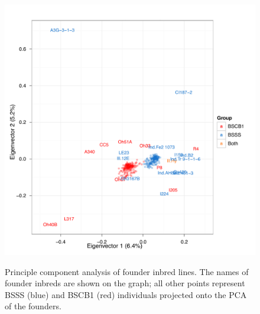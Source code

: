 \renewcommand{\thefigure}{S\arabic{figure}}
\renewcommand{\thetable}{S\arabic{table}}

\begin{figure}   
  \begin{center}
   \vspace{-0mm}
   \includegraphics[width=0.7\linewidth]{pca_founders}
   \vspace{-3mm}
   \caption{ Principle component analysis of founder inbred lines. The names of founder inbreds are shown on the graph; all other points represent BSSS (blue) and BSCB1 (red) individuals projected onto the PCA of the founders.
} 
\vspace{-6mm}
    \label{fig:sfounders}
  \end{center}
\end{figure}
\clearpage


